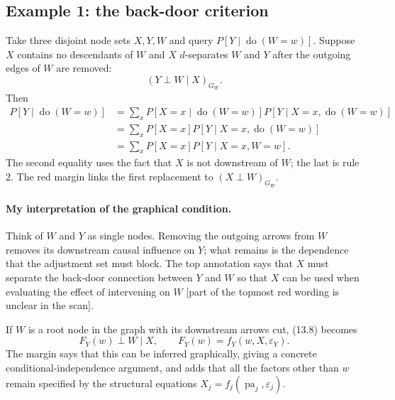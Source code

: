 \subsection{Example 1: the back-door criterion}
Take three disjoint node sets $X,Y,W$ and query $P[Y\mid\operatorname{do}(W=w)]$. Suppose $X$ contains no descendants of $W$ and $X$ $d$-separates $W$ and $Y$ after the outgoing edges of $W$ are removed:
\[
 (Y\perp W\mid X)_{G_{\underline W}}.\tag{13.8}
\]
Then
\begin{align*}
 P[Y\mid\operatorname{do}(W=w)]
 &=\sum_xP[X=x\mid\operatorname{do}(W=w)]
 P[Y\mid X=x,\operatorname{do}(W=w)]\\
 &=\sum_xP[X=x]P[Y\mid X=x,\operatorname{do}(W=w)]\\
 &=\sum_xP[X=x]P[Y\mid X=x,W=w].\tag{13.9}
\end{align*}
The second equality uses the fact that $X$ is not downstream of $W$; the last is rule 2. The red margin links the first replacement to $(X\perp W)_{G_{\overline W}}$.

\paragraph{My interpretation of the graphical condition.}
Think of $W$ and $Y$ as single nodes. Removing the outgoing arrows from $W$ removes its downstream causal influence on $Y$; what remains is the dependence that the adjustment set must block. The top annotation says that $X$ must separate the back-door connection between $Y$ and $W$ so that $X$ can be used when evaluating the effect of intervening on $W$ [part of the topmost red wording is unclear in the scan].

If $W$ is a root node in the graph with its downstream arrows cut, (13.8) becomes
\[
 F_Y(w)\perp W\mid X,\qquad
 F_Y(w)=f_Y(w,X,\varepsilon_Y).\tag{13.10}
\]
The margin says that this can be inferred graphically, giving a concrete conditional-independence argument, and adds that all the factors other than $w$ remain specified by the structural equations $X_j=f_j(\operatorname{pa}_j,\varepsilon_j)$.

